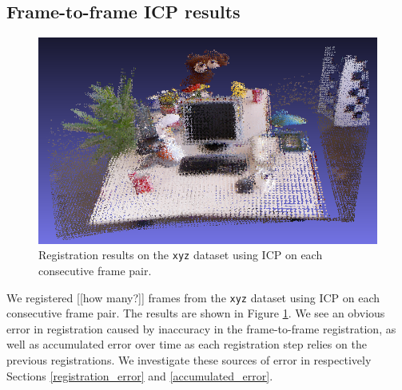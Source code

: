 \documentclass[a4paper]{article}
\begin{document}
\subsection{Frame-to-frame ICP results}

\begin{figure}[ht]
    \centering
        \includegraphics[width=\textwidth]{ims/xyz_results_f2f.png}
    \caption{Registration results on the \texttt{xyz} dataset using \ac{ICP} on each consecutive frame pair.}
    \label{fig:xyz_results_f2f}
\end{figure}


We registered [[how many?]] frames from the \texttt{xyz} dataset using \ac{ICP} on each consecutive frame pair. The results are shown in Figure \ref{fig:xyz_results_f2f}. We see an obvious error in registration caused by inaccuracy in the frame-to-frame registration, as well as accumulated error over time as each registration step relies on the previous registrations. We investigate these sources of error in respectively Sections \ref{registration_error} and \ref{accumulated_error}.



\end{document}
